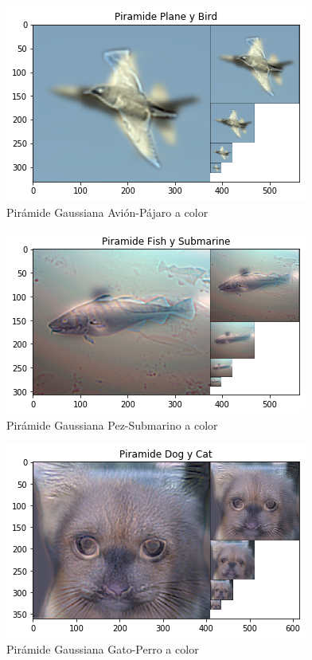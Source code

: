 \documentclass[12pt,spanish]{article}
\begin{document}
\begin{figure}[H]
	\centering
	\includegraphics[scale=1.1]{./imagenes_memoria/b2b2}
	\caption{Pirámide Gaussiana Avión-Pájaro a color}
	\label{bonus2b}
\end{figure}

\begin{figure}[H]
	\centering
	\includegraphics[scale=1.1]{./imagenes_memoria/b2c2}
	\caption{Pirámide Gaussiana Pez-Submarino a color}
	\label{bonus2c}
\end{figure}

\begin{figure}[H]
	\centering
	\includegraphics[scale=1.1]{./imagenes_memoria/b2d2}
	\caption{Pirámide Gaussiana Gato-Perro a color}
	\label{bonus2d}
\end{figure}
\end{document}

